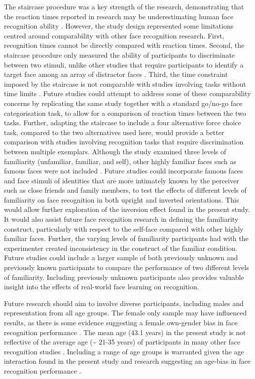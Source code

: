 \documentclass[
  10pt,
  letterpaper,
]{article}
\begin{document}
The staircase procedure was a key strength of the research,
demonstrating that the reaction times reported in research may be
underestimating human face recognition ability
\citep{besson2016a, caharel2014a, ramon2011a}. However, the study design
represented some limitations centred around comparability with other
face recognition research. First, recognition times cannot be directly
compared with reaction times. Second, the staircase procedure only
measured the ability of participants to discriminate between two
stimuli, unlike other studies that require participants to identify a
target face among an array of distractor faces \citep{megraya2006a}.
Third, the time constraint imposed by the staircase is not comparable
with studies involving tasks without time limits
\citep{zimmermann2019a}. Future studies could attempt to address some of
these comparability concerns by replicating the same study together with
a standard go/no-go face categorisation task, to allow for a comparison
of reaction times between the two tasks. Further, adapting the staircase
to include a four alternative force choice task, compared to the two
alternatives used here, would provide a better comparison with studies
involving recognition tasks that require discrimination between multiple
exemplars. Although the study examined three levels of familiarity
(unfamiliar, familiar, and self), other highly familiar faces such as
famous faces were not included \citep{campbell2020a, wiese2021a}. Future
studies could incorporate famous faces and face stimuli of identities
that are more intimately known by the perceiver such as close friends
and family members, to test the effects of different levels of
familiarity on face recognition in both upright and inverted
orientations. This would allow further exploration of the inversion
effect found in the present study. It would also assist future face
recognition research in defining the familiarity construct, particularly
with respect to the self-face compared with other highly familiar faces.
Further, the varying levels of familiarity participants had with the
experimenter created inconsistency in the construct of the familiar
condition. Future studies could include a larger sample of both
previously unknown and previously known participants to compare the
performance of two different levels of familiarity. Including previously
unknown participants also provides valuable insight into the effects of
real-world face learning on recognition.

Future research should aim to involve diverse participants, including
males and representation from all age groups. The female only sample may
have influenced results, as there is some evidence suggesting a female
own-gender bias in face recognition performance
\citep{herlitz2013a, lov2011a, mishra2019a}. The mean age (43.1 years)
in the present study is not reflective of the average age
(\textasciitilde{} 21-35 years) of participants in many other face
recognition studies
\citep{kloth2006a, mohr2018a, pachai2017a, platek2009a}. Including a
range of age groups is warranted given the age interaction found in the
present study and research suggesting an age-bias in face recognition
performance \citep{rhodes2012a}.
\end{document}
